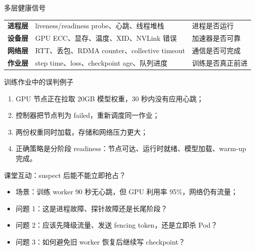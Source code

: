 \documentclass[UTF8,fontset=none,aspectratio=169,10pt]{beamer}
\begin{document}

\begin{frame}{多层健康信号}
\begin{tabularx}{\linewidth}{>{\bfseries}p{2.8cm}XX}
\toprule
进程层 & liveness/readiness probe、心跳、线程堆栈 & 进程是否运行 \\
设备层 & GPU ECC、显存、温度、XID、NVLink 错误 & 加速器是否可靠 \\
网络层 & RTT、丢包、RDMA counter、collective timeout & 通信是否可完成 \\
作业层 & step time、loss、checkpoint age、队列进度 & 训练是否真正前进 \\
\bottomrule
\end{tabularx}
\vfill
{}
\end{frame}

\begin{frame}{训练作业中的误判例子}
\begin{enumerate}
  \item GPU 节点正在拉取 20GB 模型权重，30 秒内没有应用心跳；
  \item 控制器把节点判为 failed，重新调度同一作业；
  \item 两份权重同时加载，存储和网络压力更大；
  \item 正确策略是分阶段 readiness：节点可达、运行时就绪、模型加载、warm-up 完成。
\end{enumerate}
\end{frame}

\begin{frame}{课堂互动：suspect 后能不能立即抢占？}
\begin{itemize}
  \item 场景：训练 worker 90 秒无心跳，但 GPU 利用率 95\%，网络仍有流量；
  \item 问题 1：这是进程故障、探针故障还是长尾阶段？
  \item 问题 2：应该先降级流量、发送 fencing token，还是立即杀 Pod？
  \item 问题 3：如何避免旧 worker 恢复后继续写 checkpoint？
\end{itemize}
\vfill
{}
\end{frame}

\end{document}
